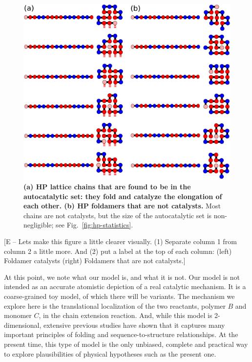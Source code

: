 \documentclass[journal=jacsat,manuscript=article,layout=twocolumn]{achemso}
\begin{document}
\begin{figure}[htb!]
  \centering
  \includegraphics[width=\columnwidth]{pictures/fold-cat.pdf} 
  \caption{\footnotesize{\textbf{(a) HP lattice chains that are found to be in the autocatalytic 
set: they fold and catalyze the elongation of each other.  (b) HP foldamers that are not 
catalysts.}  Most chains are not catalysts, but the size of the autocatalytic set is 
non-negligible; see Fig.~\ref{fig:hp-statistics}.}}
  \label{fig:fold-cat}
\end{figure}

[E -- Lets make this figure a little clearer visually.  (1) Separate column 1 from column 2 a little more.  And (2) put a label at the top of each column:  (left) Foldamer catalysts  (right) Foldamers that are not catalysts.]

 At this point, we note what our model is, and what it is not.  Our model is not intended as an 
 accurate atomistic depiction of a real catalytic mechanism.  It is a coarse-grained toy model, of 
which there will be variants.  The mechanism we explore here is the translational localization of 
the two reactants, polymer $B$ and monomer $C$, in the chain extension reaction.  And, while this 
model is 2-dimensional, extensive previous studies have shown that it captures many important 
principles of folding and sequence-to-structure relationships.  At the present time, this type of 
model is the only unbiased, complete and practical way to explore plausibilities of physical 
hypotheses such as the present one.
\end{document}
